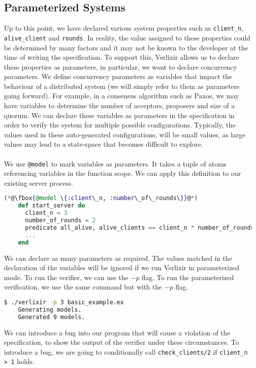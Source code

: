 \subsection{Parameterized Systems}
Up to this point, we have declared various system properties such as \texttt{client\_n}, \texttt{alive\_client} and \texttt{rounds}. In reality, the value assigned to these properties could be determined by many factors and it may not be known to the developer at the time of writing the specification. To support this, Verlixir allows us to declare these properties as parameters, in particular, we want to declare concurrency parameters. We define concurrency parameters as variables that impact the behaviour of a distributed system (we will simply refer to them as parameters going forward). For example, in a consensus algorithm such as Paxos, we may have variables to determine the number of acceptors, proposers and size of a quorum. We can declare these variables as parameters in the specification in order to verify the system for multiple possible configurations. Typically, the values used in these auto-generated configurations, will be small values, as large values may lead to a state-space that becomes difficult to explore.
\\ \\
We use \texttt{@model} to mark variables as parameters. It takes a tuple of atoms referencing variables in the function scope. We can apply this definition to our existing server process.
\begin{lstlisting}[language=Elixir, xleftmargin=.3\linewidth, caption={Example of declaring concurrency parameters in specification.}]
    (*@\fbox{@model \{:client\_n, :number\_of\_rounds\}}@*)
    def start_server do
      client_n = 3
      number_of_rounds = 2
      predicate all_alive, alive_clients == client_n * number_of_rounds
      ...
    end
\end{lstlisting}
We can declare as many parameters as required. The values matched in the declaration of the variables will be ignored if we run Verlixir in parameterized mode. To run the verifier, we can use the $-p$ flag. To run the parameterized verification, we use the same command but with the $-p$ flag.
\begin{lstlisting}[language=bash, xleftmargin=.1\linewidth]
    $ ./verlixir -p 3 basic_example.ex 
    Generating models.
    Generated 9 models.
\end{lstlisting}
We can introduce a bug into our program that will cause a violation of the specification, to show the output of the verifier under these circumstances. To introduce a bug, we are going to conditionally call \texttt{check\_clients/2} if \texttt{client\_n > 1} holds.
